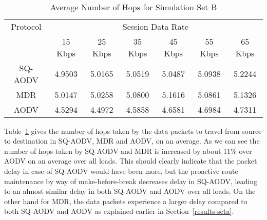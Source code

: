 \begin{table}[htbp]
\centering
\caption{Average Number of Hops for Simulation Set B}
\hfill \\
\begin{tabular}{|c|c|c|c|c|c|c|}
\hline
Protocol & \multicolumn{6}{c|}{Session Data Rate}\\
\	 & 15 Kbps & 25 Kbps & 35 Kbps & 45 Kbps & 55 Kbps & 65 Kbps\\
\hline
SQ-AODV  & 4.9503 & 5.0165 & 5.0519 & 5.0487 & 5.0938 & 5.2244 \\
\hline
MDR      & 5.0147 & 5.0258 & 5.0800 & 5.1616 & 5.0861 & 5.1326 \\
\hline
AODV     & 4.5294 & 4.4972 & 4.5858 & 4.6581 & 4.6984 & 4.7311 \\
\hline
\end{tabular}
\label{tab58}
\end{table}


Table~\ref{tab58} gives the number of hops taken by the data packets to travel from source to destination in SQ-AODV, MDR and AODV, on an average. As we can see the number of hops taken by SQ-AODV and MDR is increased by about 11\% over AODV on an average over all loads. This should clearly indicate that the packet delay in case of SQ-AODV would have been more, but the proactive route maintenance by way of make-before-break decreases delay in SQ-AODV, leading to an almost similar delay in both SQ-AODV and AODV over all loads. On the other hand for MDR, the data packets experience a larger delay compared to both SQ-AODV and AODV as explained earlier in Section~\ref{results-seta}.